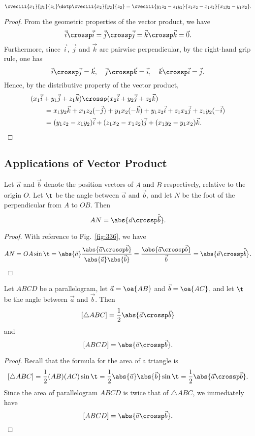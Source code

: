 \begin{proposition}
    \[\cveciii{x_1}{y_1}{z_1} \dotp \cveciii{x_2}{y_2}{z_2} = \cveciii{y_1 z_2 - z_1 y_2}{z_1 x_2 - x_1 z_2}{x_1 y_2 - y_1 x_2}.\]
\end{proposition}
\begin{proof}
    From the geometric properties of the vector product, we have \[\vec i \crossp \vec i = \vec j \crossp \vec j = \vec k \crossp \vec k = \vec 0.\] Furthermore, since $\vec i$, $\vec j$ and $\vec k$ are pairwise perpendicular, by the right-hand grip rule, one has \[\vec i \crossp \vec j = \vec k, \quad \vec j \crossp \vec k = \vec i, \quad \vec k \crossp \vec i = \vec j.\] Hence, by the distributive property of the vector product,
    \begin{align*}
        &(x_1 \vec i + y_1 \vec j + z_1 \vec k) \crossp (x_2 \vec i + y_2 \vec j + z_2 \vec k) \\
        &\hspace{2em}= x_1 y_2 \vec k + x_1 z_2 (-\vec j) + y_1 x_2 (-\vec k) + y_1 z_2 \vec i + z_1 x_2 \vec j + z_1 y_2 (-\vec i) \\
        &\hspace{2em}=(y_1 z_2 - z_1 y_2) \vec i + (z_1 x_2 - x_1 z_2) \vec j + (x_1 y_2 - y_1 x_2) \vec k.
    \end{align*}
\end{proof}

\subsection{Applications of Vector Product}

\begin{proposition}
    Let $\vec a$ and $\vec b$ denote the position vectors of $A$ and $B$ respectively, relative to the origin $O$. Let $\t$ be the angle between $\vec a$ and $\vec b$, and let $N$ be the foot of the perpendicular from $A$ to $OB$. Then \[AN = \abs{\vec a \crossp \hat{\vec b}}.\]
\end{proposition}
\begin{proof}
    With reference to Fig.~\ref{fig:336}, we have \[AN = OA \sin \t = \abs{\vec a} \frac{\abs{\vec a \crossp \vec b}}{\abs{\vec a}\abs{\vec b}} = \frac{\abs{\vec a \crossp \vec b}}{\vec b} = \abs{\vec a \crossp \hat{\vec b}}.\]
\end{proof}

\begin{proposition}
    Let $ABCD$ be a parallelogram, let $\vec a = \oa{AB}$ and $\vec b = \oa{AC}$, and let $\t$ be the angle between $\vec a$ and $\vec b$. Then \[[\triangle ABC] = \frac12 \abs{\vec a \crossp \vec b}\] and \[[ABCD] = \abs{\vec a \crossp \vec b}.\]
\end{proposition}
\begin{proof}
    Recall that the formula for the area of a triangle is \[[\triangle ABC] = \frac12 (AB)(AC) \sin \t = \frac12 \abs{\vec a} \abs{\vec b} \sin \t = \frac12 \abs{\vec a \crossp \vec b}.\] Since the area of parallelogram $ABCD$ is twice that of $\triangle ABC$, we immediately have \[[ABCD] = \abs{\vec a \crossp \vec b}.\]
\end{proof}
